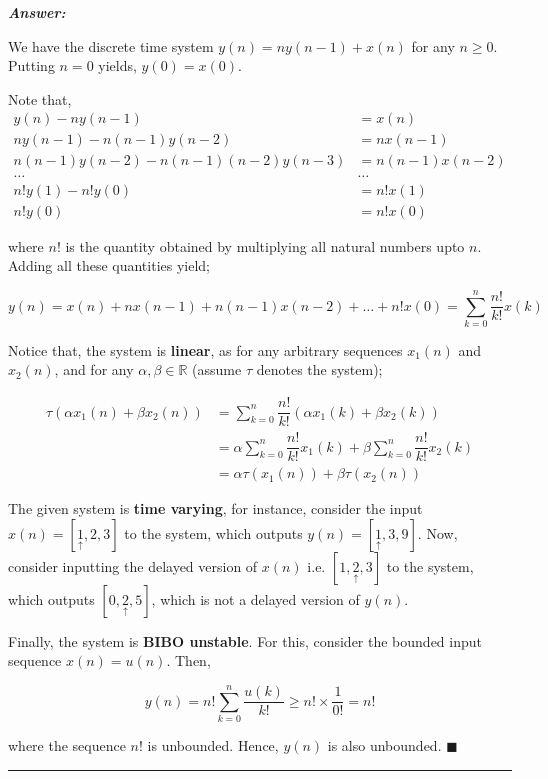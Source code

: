 \documentclass[12pt]{article}
\theoremstyle{definition}
\newenvironment{answer}{
    \textbf{\textit{Answer:}} \qquad
}{\hfill $\blacksquare$ \\ \begin{center}
    \rule{0.6\linewidth}{0.5px}    
\end{center}
}
\newcommand{\R}{\mathbb{R}}
\begin{document}
\begin{answer}
    We have the discrete time system $y(n) = n y(n-1) + x(n)$ for any $n \geq 0$. Putting $n = 0$ yields, $y(0) = x(0)$.

    Note that,
    \begin{align*}
        y(n) - n y(n-1) & = x(n)\\
        ny(n-1) - n(n-1) y(n-2) & = nx(n-1)\\
        n(n-1) y(n-2) - n(n-1)(n-2) y(n-3) & = n(n-1)x(n-2)\\
        \dots & \dots\\
        n! y(1) - n! y(0) & = n! x(1)\\
        n!y(0) & = n! x(0)
    \end{align*}

    where $n!$ is the quantity obtained by multiplying all natural numbers upto $n$. Adding all these quantities yield; 

    $$
    y(n) = x(n) + nx(n-1) + n(n-1)x(n-2) + \dots + n! x(0) = \sum_{k = 0}^{n} \dfrac{n!}{k!} x(k)
    $$

    Notice that, the system is \textbf{linear}, as for any arbitrary sequences $x_1(n)$ and $x_2(n)$, and for any $\alpha, \beta \in \R$ (assume $\tau$ denotes the system);

    \begin{align*}
        \tau(\alpha x_1(n) + \beta x_2(n)) 
        & = \sum_{k = 0}^{n} \dfrac{n!}{k!} (\alpha x_1(k) + \beta x_2(k)) \\
        & = \alpha \sum_{k = 0}^{n} \dfrac{n!}{k!} x_1(k) + \beta \sum_{k = 0}^{n} \dfrac{n!}{k!} x_2(k)\\
        & = \alpha \tau(x_1(n)) + \beta \tau(x_2(n))
    \end{align*}

    The given system is \textbf{time varying}, for instance, consider the input $x(n) = [\underset{\uparrow}{1}, 2, 3]$ to the system, which outputs $y(n) = [\underset{\uparrow}{1}, 3, 9]$. Now, consider inputting the delayed version of $x(n)$ i.e. $[1, \underset{\uparrow}{2}, 3]$ to the system, which outputs $[0, \underset{\uparrow}{2}, 5]$, which is not a delayed version of $y(n)$.

    Finally, the system is \textbf{BIBO unstable}. For this, consider the bounded input sequence $x(n) = u(n)$. Then, 
    
    $$
    y(n) = n! \sum_{k = 0}^{n} \dfrac{u(k)}{k!} \geq n! \times \dfrac{1}{0!} = n!
    $$

    where the sequence $n!$ is unbounded. Hence, $y(n)$ is also unbounded.
\end{answer}
\end{document}
